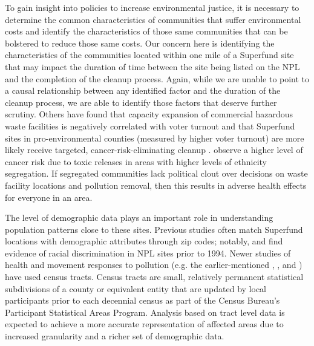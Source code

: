 \documentclass[12pt]{article}
\begin{document}

To gain insight into policies to increase environmental justice, it is necessary to determine the common characteristics of communities that suffer environmental costs and identify the characteristics of those same communities that can be bolstered to reduce those same costs. Our concern here is identifying the characteristics of the communities located within one mile of a Superfund site that may impact the duration of time between the site being listed on the NPL and the completion of the cleanup process. Again, while we are unable to point to a causal relationship between any identified factor and the duration of the cleanup process, we are able to identify those factors that deserve further scrutiny. Others have found that capacity expansion of commercial hazardous waste facilities is negatively correlated with voter turnout \parencite{Hamilton1995} and that Superfund sites in pro-environmental counties (measured by higher voter turnout) are more likely receive targeted, cancer-risk-eliminating cleanup \parencite{hamilton1999calculating}. \textcite{Morello-Frosch2006} observe a higher level of cancer risk due to toxic releases in areas with higher levels of ethnicity segregation. If segregated communities lack political clout over decisions on waste facility locations and pollution removal, then this results in adverse health effects for everyone in an area. 

The level of demographic data plays an important role in understanding population patterns close to these sites. Previous studies often match Superfund locations with demographic attributes through zip codes; notably, \textcite{burda2014environmental} and find evidence of racial discrimination in NPL sites prior to 1994. Newer studies of health and movement responses to pollution (e.g. the earlier-mentioned \textcite{Morello-Frosch2006}, \textcite{Gamper-Rabindran2013}, and \textcite{Depro2015}) have used census tracts. Census tracts are small, relatively permanent statistical subdivisions of a county or equivalent entity that are updated by local participants prior to each decennial census as part of the Census Bureau's Participant Statistical Areas Program. Analysis based on tract level data is expected to achieve a more accurate representation of affected areas due to increased granularity \parencite{ProximityOne2019} and a richer set of demographic data.

\end{document}
